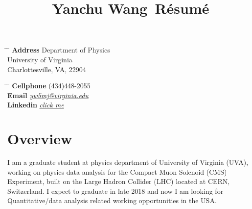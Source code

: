 \documentclass[10pt]{article} %
\begin{document}

\title{Yanchu Wang\, \small{Résumé}} %


\parbox{0.5\textwidth}{ %
\begin{tabbing} %
\hspace{3cm} \= \hspace{4cm} \= \kill %
{\bf Address} \> Department of Physics \\
\> University of Virginia\\ %
\> Charlottesville, VA, 22904 \\ %

\end{tabbing}}
\hfill %
\parbox{0.5\textwidth}{ %
\begin{tabbing} %
\hspace{3cm} \= \hspace{4cm} \= \kill %
{\bf Cellphone} \> (434)448-2055 \\ %
{\bf Email} \> \href{mailto:yw5mj@virginia.edu}{\textit{yw5mj@virginia.edu}} \\ %
{\bf Linkedin} \> \href{https://www.linkedin.com/in/yanchu-wang-46040289/}{\textit{click me}} \\ %
\end{tabbing}}


\section{Overview}

I am a graduate student at physics department of University of Virginia (UVA), working on physics data analysis for the Compact Muon Solenoid (CMS) Experiment, built on the Large Hadron Collider (LHC) located at CERN, Switzerland. I expect to graduate in late 2018 and now I am looking for Quantitative/data analysis related working opportunities in the USA.
\end{document}

